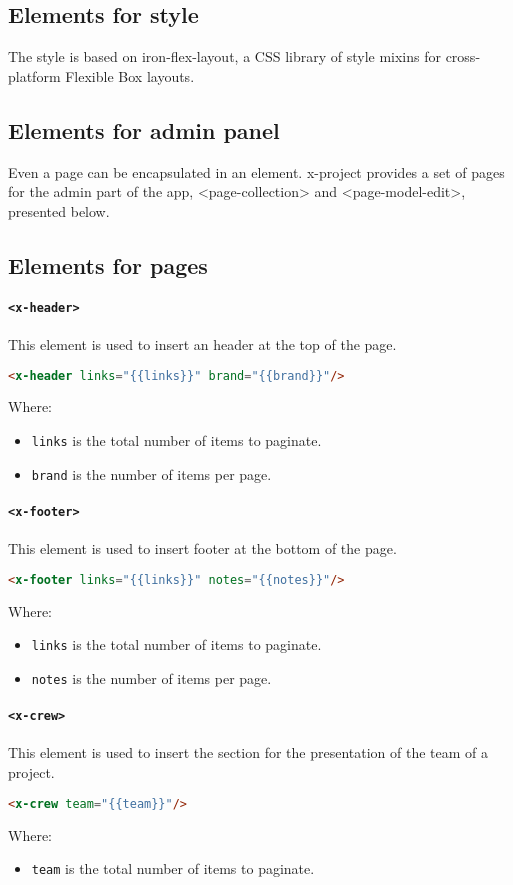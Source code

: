\subsection{Elements for style}

The style is based on iron-flex-layout, a CSS library of style mixins for cross-platform Flexible Box layouts.

\subsection{Elements for admin panel}

Even a page can be encapsulated in an element. x-project provides a set of pages for the admin part of the app, <page-collection> and <page-model-edit>, presented below.

\subsection{Elements for pages}

\paragraph{\texttt{<x-header>}} This element is used to insert an header at the top of the page.
\begin{lstlisting}[language=html]
<x-header links="{{links}}" brand="{{brand}}"/>
\end{lstlisting}
Where:
\begin{itemize}
\item \texttt{links} is the total number of items to paginate.
\item \texttt{brand} is the number of items per page.
\end{itemize}
\paragraph{\texttt{<x-footer>}} This element is used to insert footer at the bottom of the page.
\begin{lstlisting}[language=html]
<x-footer links="{{links}}" notes="{{notes}}"/>
\end{lstlisting}
Where:
\begin{itemize}
\item \texttt{links} is the total number of items to paginate.
\item \texttt{notes} is the number of items per page.
\end{itemize}
\paragraph{\texttt{<x-crew>}} This element is used to insert the section for the presentation of the team of a project.
\begin{lstlisting}[language=html]
<x-crew team="{{team}}"/>\end{lstlisting}
Where:
\begin{itemize}
\item \texttt{team} is the total number of items to paginate.
\end{itemize}
